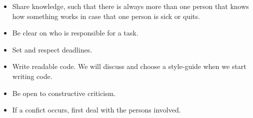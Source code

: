 \documentclass[norsk]{article}
\begin{document}
  \begin{itemize}
  	\item 
  	Share knowledge, such that there is always more than one person that knows how something works in case that one person is sick or quits.
  	\item 
  	Be clear on who is responsible for a task.
  	\item 
  	Set and respect deadlines.
  	\item 
  	Write readable code. We will discuss and choose a style-guide when we start writing code. 
  	\item 
  	Be open to constructive criticism.
  	\item
  	If a confict occurs, first deal with the persons involved. 
 \end{itemize}
	
\end{document}
